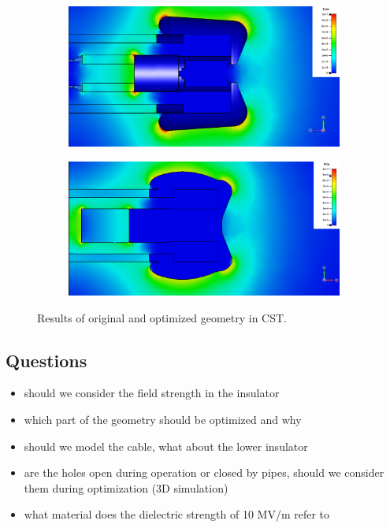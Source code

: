 \begin{center}
\begin{figure}[H]
   \begin{subfigure}{0.45\textwidth}
      \includegraphics[width=\textwidth]{figures/200kV/cst/efield_orig}
   \end{subfigure}
   \begin{subfigure}{0.45\textwidth}
      \includegraphics[width=\textwidth]{figures/200kV/cst/efield_insulator}
   \end{subfigure}
   \caption{Results of original and optimized geometry in CST.}
\end{figure}
\end{center}

\subsection{Questions}
\begin{itemize}
   \item should we consider the field strength in the insulator
   \item which part of the geometry should be optimized and why
   \item should we model the cable, what about the lower insulator
   \item are the holes open during operation or closed by pipes, should we consider them during optimization (3D simulation)
   \item what material does the dielectric strength of 10 MV/m refer to
\end{itemize}

